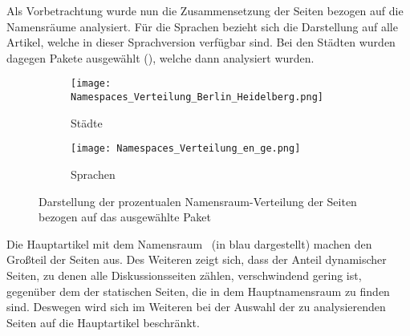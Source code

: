 \documentclass[fontsize=11pt, twoside, a4paper]{scrartcl}
\begin{document}
Als Vorbetrachtung wurde nun die Zusammensetzung der Seiten bezogen auf die Namensräume analysiert. Für die Sprachen bezieht sich die Darstellung auf alle Artikel, welche in dieser Sprachversion verfügbar sind. Bei den Städten wurden dagegen Pakete ausgewählt (), welche dann analysiert wurden.
\begin{figure}[H]
\centering
	\begin{minipage}[t]{0.45\textwidth}
		\begin{figure}[H]
		\texttt{[image: Namespaces\_Verteilung\_Berlin\_Heidelberg.png]}
		\caption*{Städte}
		\end{figure}
	\end{minipage}
	\begin{minipage}[t]{0.45\textwidth}
		\begin{figure}[H]
		\texttt{[image: Namespaces\_Verteilung\_en\_ge.png]}
		\caption*{Sprachen}
		\end{figure}
	\end{minipage}	
\caption{Darstellung der prozentualen Namensraum-Verteilung der Seiten bezogen auf das ausgewählte Paket}
\end{figure}
Die Hauptartikel mit dem Namensraum  \grqq \, (in blau dargestellt) machen den Großteil der Seiten aus. Des Weiteren zeigt sich, dass der Anteil dynamischer Seiten, zu denen alle Diskussionsseiten zählen, verschwindend gering ist, gegenüber dem der statischen Seiten, die in dem Hauptnamensraum zu finden sind. Deswegen wird sich im Weiteren bei der Auswahl der zu analysierenden Seiten auf die Hauptartikel beschränkt. 
\end{document}
